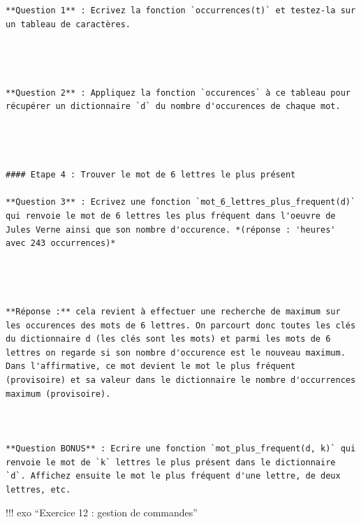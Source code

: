 \documentclass[
]{article}
\begin{document}
\begin{verbatim}
**Question 1** : Ecrivez la fonction `occurrences(t)` et testez-la sur un tableau de caractères.




**Question 2** : Appliquez la fonction `occurences` à ce tableau pour récupérer un dictionnaire `d` du nombre d'occurences de chaque mot.




#### Etape 4 : Trouver le mot de 6 lettres le plus présent

**Question 3** : Ecrivez une fonction `mot_6_lettres_plus_frequent(d)` qui renvoie le mot de 6 lettres les plus fréquent dans l'oeuvre de Jules Verne ainsi que son nombre d'occurence. *(réponse : 'heures' avec 243 occurrences)*




**Réponse :** cela revient à effectuer une recherche de maximum sur les occurences des mots de 6 lettres. On parcourt donc toutes les clés du dictionnaire d (les clés sont les mots) et parmi les mots de 6 lettres on regarde si son nombre d'occurence est le nouveau maximum. Dans l'affirmative, ce mot devient le mot le plus fréquent (provisoire) et sa valeur dans le dictionnaire le nombre d'occurrences maximum (provisoire).



**Question BONUS** : Ecrire une fonction `mot_plus_frequent(d, k)` qui renvoie le mot de `k` lettres le plus présent dans le dictionnaire `d`. Affichez ensuite le mot le plus fréquent d'une lettre, de deux lettres, etc.
\end{verbatim}

!!! exo ``Exercice 12 : gestion de commandes''
\end{document}
